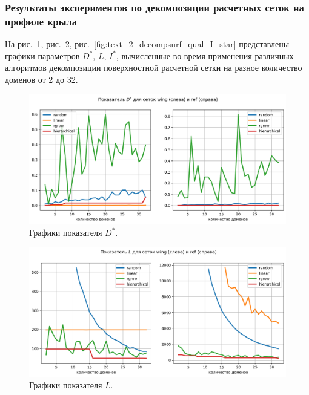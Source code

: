 \subsubsection{Результаты экспериментов по декомпозиции расчетных сеток на профиле крыла}

На рис.~\ref{fig:text_2_decompsurf_qual_D_star}, рис.~\ref{fig:text_2_decompsurf_qual_L}, рис.~\ref{fig:text_2_decompsurf_qual_I_star} представлены графики параметров $D^{*}$, $L$, $I^{*}$, вычисленные во время применения различных алгоритмов декомпозиции поверхностной расчетной сетки на разное количество доменов от 2 до 32.

\begin{figure}[h]
	\centering
	\includegraphics[width=1.0\textwidth]{./pics/text_2_decompsurf/qual_D_star.png}
	\caption{Графики показателя $D^{*}$.}
	\label{fig:text_2_decompsurf_qual_D_star}
\end{figure}

\begin{figure}[H]
	\centering
	\includegraphics[width=1.0\textwidth]{./pics/text_2_decompsurf/qual_L.png}
	\caption{Графики показателя $L$.}
	\label{fig:text_2_decompsurf_qual_L}
\end{figure}

